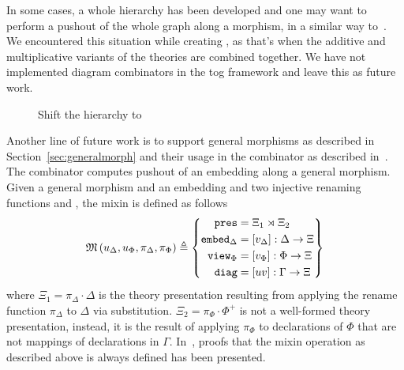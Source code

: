 In some cases, a whole hierarchy has been developed and one may want to perform a pushout of the whole graph along a morphism, in a similar way to~\cite{cicm2019diagrams}. We encountered this situation while creating , as that's when the additive and multiplicative variants of the theories are combined together. We have not implemented diagram combinators in the tog framework and leave this as future work. 
\begin{figure}[h]
\caption{Shift the  hierarchy to }
\label{fig:shiftPMtoRingoid}
\end{figure}

Another line of future work is to support general morphisms as described in Section~\ref{sec:generalmorph} and their usage in the  combinator as described in~\cite{carette2018building}. 
The  combinator computes pushout of an embedding along a general morphism. Given a general morphism  and an embedding  and two injective renaming functions 
and , the mixin is defined as follows 
\[
\mathfrak{M}\left( u_{\Delta}, u_{\Phi}, \pi_{\Delta}, \pi_{\Phi}\right) \triangleq
\left\{\begin{aligned}
  \mathtt{pres} & = \Xi_1\rtimes\Xi_2 \\
  \mathtt{embed}_{\Delta} & = \left[v_{\Delta}\right] : \Delta\rightarrow\Xi\\
  \mathtt{view}_{\Phi} & = \left[v_{\Phi}\right] : \Phi\rightarrow\Xi\\
  \mathtt{diag} & = \left[uv\right]:\Gamma\rightarrow\Xi\\
\end{aligned}\right\}
\]
where $\Xi_1 = \pi_\Delta \cdot \Delta$ is the theory presentation resulting from applying the rename function $\pi_\Delta$ to $\Delta$ via substitution. 
$\Xi_2 = \pi_\Phi \cdot \Phi^+$ is not a well-formed theory presentation, instead, it is the result of applying $\pi_\Phi$ to declarations of $\Phi$ that are not mappings of declarations in $\Gamma$. 
In~\cite{carette2018building}, proofs that the mixin operation as described above is always defined has been presented. 

